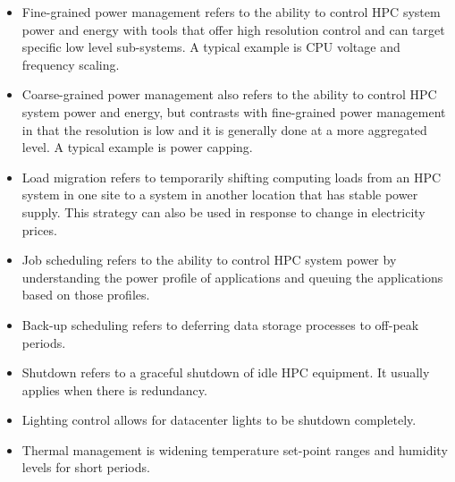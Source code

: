 \begin{itemize}
\item Fine-grained power management refers to the ability to control HPC system power 
and energy with tools that offer high resolution control and can target specific 
low level sub-systems. A typical example is CPU voltage and frequency scaling.

\item Coarse-grained power management also refers to the ability to control HPC 
system power and energy, but contrasts with fine-grained power management in 
that the resolution is low and it is generally done at a more aggregated level. 
A typical example is power capping.

\item Load migration refers to temporarily shifting computing loads from 
an HPC system in one site to a system in another location that has stable power supply. 
This strategy can also be used in response to change in electricity prices.

\item Job scheduling refers to the ability to control HPC system power 
by understanding the power profile of applications and queuing the 
applications based on those profiles.

\item Back-up scheduling refers to deferring data storage processes to off-peak periods.

\item Shutdown refers to a graceful shutdown of idle HPC equipment. It usually 
applies when there is redundancy.

\item Lighting control allows for datacenter lights to be shutdown completely.

\item Thermal management is widening temperature set-point ranges and 
humidity levels for short periods.
\end{itemize}

